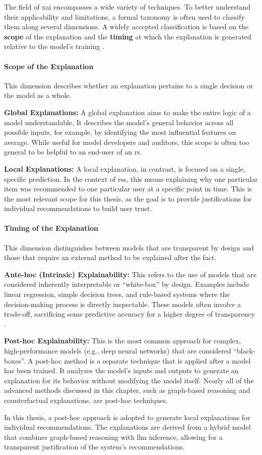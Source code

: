 The field of \ac{xai} encompasses a wide variety of techniques. To better understand their applicability and limitations, a formal taxonomy is often used to classify them along several dimensions. A widely accepted classification is based on the \textbf{scope} of the explanation and the \textbf{timing} at which the explanation is generated relative to the model's training \cite{SOTA-XAI-SURVEY}.

\paragraph{Scope of the Explanation}
This dimension describes whether an explanation pertains to a single decision or the model as a whole.
\begin{compactitem}[\textbullet]
    \item \textbf{Global Explanations:} A global explanation aims to make the entire logic of a model understandable. It describes the model's general behavior across all possible inputs, for example, by identifying the most influential features on average. While useful for model developers and auditors, this scope is often too general to be helpful to an end-user of an \ac{rs}.
    \item \textbf{Local Explanations:} A local explanation, in contrast, is focused on a single, specific prediction. In the context of \acp{rs}, this means explaining why one particular item was recommended to one particular user at a specific point in time. This is the most relevant scope for this thesis, as the goal is to provide justifications for individual recommendations to build user trust.
\end{compactitem}

\paragraph{Timing of the Explanation}
This dimension distinguishes between models that are transparent by design and those that require an external method to be explained after the fact.
\begin{compactitem}[\textbullet]
    \item \textbf{Ante-hoc (Intrinsic) Explainability:} This refers to the use of models that are considered inherently interpretable or ``white-box'' by design. Examples include linear regression, simple decision trees, and rule-based systems where the decision-making process is directly inspectable. These models often involve a trade-off, sacrificing some predictive accuracy for a higher degree of transparency \cite{SOTA-EXP-EVALUATION}.
    \item \textbf{Post-hoc Explainability:} This is the most common approach for complex, high-performance models (e.g., deep neural networks) that are considered ``black-boxes''. A post-hoc method is a separate technique that is applied after a model has been trained. It analyzes the model's inputs and outputs to generate an explanation for its behavior without modifying the model itself. Nearly all of the advanced methods discussed in this chapter, such as graph-based reasoning and counterfactual explanations, are post-hoc techniques.
\end{compactitem}

In this thesis, a post-hoc approach is adopted to generate local explanations for individual recommendations. The explanations are derived from a hybrid model that combines graph-based reasoning with \ac{llm} inference, allowing for a transparent justification of the system's recommendations.